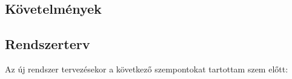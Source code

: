 \chapter{\SystemDesign}
\section{Követelmények}



\section{Rendszerterv}


Az új rendszer tervezésekor a következő szempontokat tartottam szem előtt:






